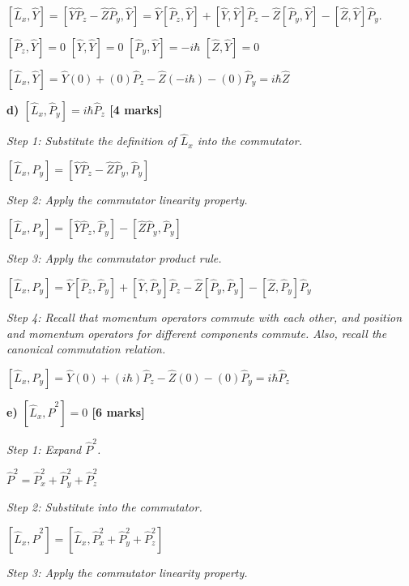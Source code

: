 \documentclass{article}
\begin{document}
$\left[\hat{L}_x, \hat{Y}\right] = \left[\hat{Y}\hat{P}_z - \hat{Z}\hat{P}_y, \hat{Y}\right] = \hat{Y}\left[\hat{P}_z, \hat{Y}\right] + \left[\hat{Y}, \hat{Y}\right]\hat{P}_z - \hat{Z}\left[\hat{P}_y, \hat{Y}\right] - \left[\hat{Z}, \hat{Y}\right]\hat{P}_y$.

$\left[\hat{P}_z, \hat{Y}\right] = 0$
$\left[\hat{Y}, \hat{Y}\right] = 0$
$\left[\hat{P}_y, \hat{Y}\right] = -i\hbar$
$\left[\hat{Z}, \hat{Y}\right] = 0$

$\left[\hat{L}_x, \hat{Y}\right] = \hat{Y}(0) + (0)\hat{P}_z - \hat{Z}(-i\hbar) - (0)\hat{P}_y = i\hbar\hat{Z}$

\textbf{d) $\left[\hat{L}_x, \hat{P}_y\right] = i\hbar \hat{P}_z$ [4 marks]}

\textit{Step 1: Substitute the definition of $\hat{L}_x$ into the commutator.}

$\left[\hat{L}_x, \hat{P}_y\right] = \left[\hat{Y}\hat{P}_z - \hat{Z}\hat{P}_y, \hat{P}_y\right]$

\textit{Step 2: Apply the commutator linearity property.}

$\left[\hat{L}_x, \hat{P}_y\right] = \left[\hat{Y}\hat{P}_z, \hat{P}_y\right] - \left[\hat{Z}\hat{P}_y, \hat{P}_y\right]$

\textit{Step 3: Apply the commutator product rule.}

$\left[\hat{L}_x, \hat{P}_y\right] = \hat{Y}\left[\hat{P}_z, \hat{P}_y\right] + \left[\hat{Y}, \hat{P}_y\right]\hat{P}_z - \hat{Z}\left[\hat{P}_y, \hat{P}_y\right] - \left[\hat{Z}, \hat{P}_y\right]\hat{P}_y$

\textit{Step 4: Recall that momentum operators commute with each other, and position and momentum operators for different components commute. Also, recall the canonical commutation relation.}

$\left[\hat{L}_x, \hat{P}_y\right] = \hat{Y}(0) + (i\hbar)\hat{P}_z - \hat{Z}(0) - (0)\hat{P}_y = i\hbar\hat{P}_z$

\textbf{e) $\left[\hat{L}_x, \hat{P}^2\right] = 0$ [6 marks]}

\textit{Step 1: Expand $\hat{P}^2$.}

$\hat{P}^2 = \hat{P}_x^2 + \hat{P}_y^2 + \hat{P}_z^2$

\textit{Step 2: Substitute into the commutator.}

$\left[\hat{L}_x, \hat{P}^2\right] = \left[\hat{L}_x, \hat{P}_x^2 + \hat{P}_y^2 + \hat{P}_z^2\right]$

\textit{Step 3: Apply the commutator linearity property.}
\end{document}
